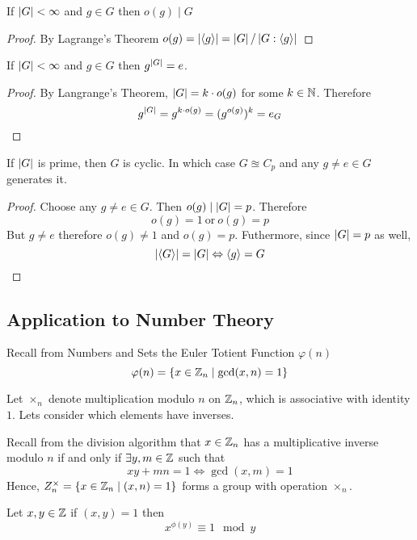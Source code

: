 \documentclass{article}
\begin{document}
\begin{cor}
    If $\left\lvert G\right\rvert < \infty$ and $g \in G$ then $o(g) \mid G$
\end{cor}
\begin{proof}
    By Lagrange's Theorem
    $o(g) = \left\lvert \left\langle g\right\rangle\right\rvert = \left\lvert G\right\rvert / \left\lvert G : \left\langle g\right\rangle\right\rvert$
\end{proof}


\begin{cor}
    If $\left\lvert G\right\rvert < \infty$ and $g \in G$ then $g^{\left\lvert G\right\rvert} = e$.
\end{cor}
\begin{proof}
    By Langrange's Theorem, $\left\lvert G\right\rvert = k \cdot o(g)$ for some $k \in \mathbb{N}$. Therefore
    \[
        g^{\left\lvert G\right\rvert} = g^{k \cdot o(g)} = (g^{o(g)})^k = e_G
    \]
\end{proof}

\begin{cor}
    If $\left\lvert G\right\rvert$ is prime, then $G$ is cyclic. In which case $G \approxeq C_p$ and any $g \neq e \in G$ generates it.
\end{cor}
\begin{proof}
    Choose any $g \neq e \in G$. Then $o(g) \mid \left\lvert G\right\rvert = p$. Therefore
    \[
        o(g) = 1 \ \text{or} \ o(g) = p  
    \]
    But $g \neq e$ therefore $o(g) \neq 1$ and $o(g) = p$. Futhermore, since $\left\lvert G\right\rvert = p$ as well,
    \[
        \left\lvert \left\langle G\right\rangle\right\rvert = \left\lvert G\right\rvert \Leftrightarrow \left\langle g\right\rangle = G  
    \]
\end{proof}

\subsection*{Application to Number Theory}
Recall from Numbers and Sets the Euler Totient Function $\varphi(n)$
\[
    \varphi(n) = \{x \in \mathbb{Z}_n \mid \gcd(x, n) = 1\}
\]

Let $\times_n$ denote multiplication modulo $n$ on $\mathbb{Z}_n$, which is associative with identity $1$. Lets consider which elements have inverses.

Recall from the division algorithm that $x \in \mathbb{Z}_n$ has a multiplicative inverse modulo $n$ if and only if $\exists y, m \in \mathbb{Z}$ such that
\[
    xy + mn = 1 \Leftrightarrow \gcd(x, m) = 1    
\]
Hence, $Z_n^{\times} = \{x \in \mathbb{Z}_n \mid (x, n) = 1\}$ forms a group with operation $\times_n$.

\begin{thm}
    Let $x, y \in \mathbb{Z}$ if $(x, y) = 1$ then
    \[
        x^{\phi(y)} \equiv 1 \mod y  
    \]
\end{thm}
\end{document}
